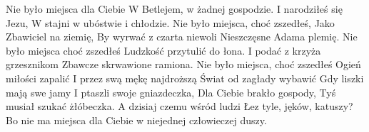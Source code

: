\beginverse
Nie było miejsca dla Ciebie
W Betlejem, w żadnej gospodzie.
I narodziłeś się Jezu,
W stajni w ubóstwie i chłodzie.
\endverse
\beginchorus
Nie było miejsca, choć zszedłeś,
Jako Zbawiciel na ziemię,
By wyrwać z czarta niewoli
Nieszczęsne Adama plemię.
\endchorus
\beginverse
Nie było miejsca choć zszedłeś
Ludzkość przytulić do łona.
I podać z krzyża grzesznikom
Zbawcze skrwawione ramiona.
\endverse
\beginchorus
Nie było miejsca, choć zszedłeś
Ogień miłości zapalić
I przez swą mękę najdroższą
Świat od zagłady wybawić
\endchorus
\beginverse
Gdy liszki mają swe jamy
I ptaszli swoje gniazdeczka,
Dla Ciebie brakło gospody,
Tyś musiał szukać żłóbeczka.
\endverse
\beginchorus
A dzisiaj czemu wśród ludzi
Łez tyle, jęków, katuszy?
Bo nie ma miejsca dla Ciebie
w niejednej człowieczej duszy.
\endchorus
\endsong